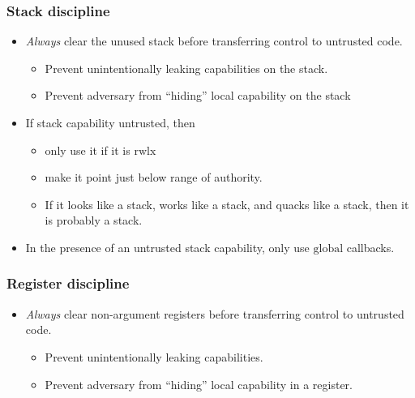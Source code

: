 \documentclass{beamer}
\newcommand{\plainperm}[1]{\mathrm{#1}}
\newcommand{\rwlx}{\plainperm{rwlx}}
\newcommand{\glob}{\plainperm{global}}
\begin{document}
\begin{frame}
  \frametitle{Stack discipline}
  \begin{itemize}[<+->]
  \item \emph{Always} clear the unused stack before transferring control to untrusted code.
    \begin{itemize}
    \item Prevent unintentionally leaking capabilities on the stack.
    \item Prevent adversary from ``hiding'' local capability on the stack
    \end{itemize}
  \item If stack capability untrusted, then 
    \begin{itemize}
    \item only use it if it is $\rwlx$
    \item make it point just below range of authority.
    \item If it looks like a stack, works like a stack, and quacks like a stack, then it is probably a stack.
    \end{itemize}
    \item In the presence of an untrusted stack capability, only use $\glob$ callbacks.
  \end{itemize}  
\end{frame}

\begin{frame}
  \frametitle{Register discipline}
  \begin{itemize}[<+->]
  \item \emph{Always} clear non-argument registers before transferring control to untrusted code.
    \begin{itemize}
    \item Prevent unintentionally leaking capabilities.
    \item Prevent adversary from ``hiding'' local capability in a register.
    \end{itemize}
  \end{itemize}  
\end{frame}
\end{document}
